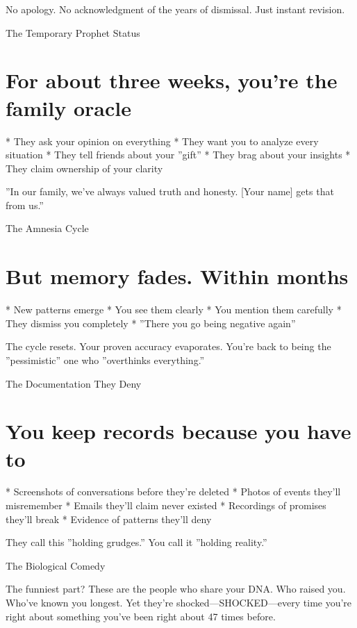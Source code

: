 \documentclass[12pt,oneside]{book}
\begin{document}
No apology. No acknowledgment of the years of dismissal. Just instant revision.

The Temporary Prophet Status

\section{For about three weeks, you're the family oracle}

                    * They ask your opinion on everything
                    * They want you to analyze every situation
                    * They tell friends about your ''gift''
                    * They brag about your insights
                    * They claim ownership of your clarity

''In our family, we've always valued truth and honesty. [Your name] gets that from us.''

The Amnesia Cycle

\section{But memory fades. Within months}

                    * New patterns emerge
                    * You see them clearly
                    * You mention them carefully
                    * They dismiss you completely
                    * ''There you go being negative again''

The cycle resets. Your proven accuracy evaporates. You're back to being the ''pessimistic'' one who ''overthinks everything.''

The Documentation They Deny

\section{You keep records because you have to}

                    * Screenshots of conversations before they're deleted
                    * Photos of events they'll misremember
                    * Emails they'll claim never existed
                    * Recordings of promises they'll break
                    * Evidence of patterns they'll deny

They call this ''holding grudges.'' You call it ''holding reality.''

The Biological Comedy

The funniest part? These are the people who share your DNA. Who raised you. Who've known you longest. Yet they're shocked---SHOCKED---every time you're right about something you've been right about 47 times before.
\end{document}
